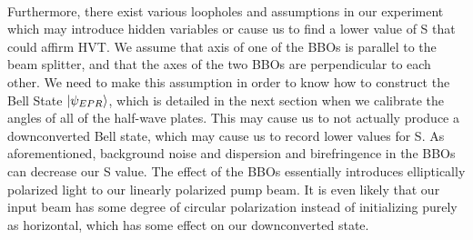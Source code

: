 \documentclass{article}
\begin{document}
    \\\indent Furthermore, there exist various loopholes and assumptions in our experiment which may introduce hidden variables or cause us to find a lower value of S that could affirm HVT. We assume that axis of one of the BBOs is parallel to the beam splitter, and that the axes of the two BBOs are perpendicular to each other. We need to make this assumption in order to know how to construct the Bell State $\left\vert{\psi_{EPR}}\right\rangle$, which is detailed in the next section when we calibrate the angles of all of the half-wave plates. This may cause us to not actually produce a downconverted Bell state, which may cause us to record lower values for S. As aforementioned, background noise and dispersion and birefringence in the BBOs can decrease our S value. The effect of the BBOs essentially introduces elliptically polarized light to our linearly polarized pump beam. It is even likely that our input beam has some degree of circular polarization instead of initializing purely as horizontal, which has some effect on our downconverted state. 
\end{document}
